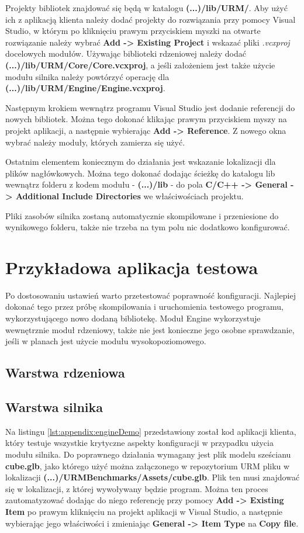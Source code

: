 Projekty bibliotek znajdować się będą w katalogu \textbf{(...)/lib/URM/}. Aby użyć ich z aplikacją klienta należy dodać projekty do rozwiązania przy pomocy Visual Studio, w którym po kliknięciu prawym przyciskiem myszki na otwarte rozwiązanie należy wybrać \textbf{Add -> Existing Project} i wskazać pliki \textit{.vcxproj} docelowych modułów. Używając biblioteki rdzeniowej należy dodać \textbf{(...)/lib/URM/Core/Core.vcxproj}, a jeśli założeniem jest także użycie modułu silnika należy powtórzyć operację dla \textbf{(...)/lib/URM/Engine/Engine.vcxproj}.

Następnym krokiem wewnątrz programu Visual Studio jest dodanie referencji do nowych bibliotek. Można tego dokonać klikając prawym przyciskiem myszy na projekt aplikacji, a następnie wybierając \textbf{Add -> Reference}. Z nowego okna wybrać należy moduły, których zamierza się użyć.

Ostatnim elementem koniecznym do działania jest wskazanie lokalizacji dla plików nagłówkowych. Można tego dokonać dodając ścieżkę do katalogu lib wewnątrz folderu z kodem modułu - \textbf{(...)/lib} - do pola \textbf{C/C++ -> General -> Additional Include Directories} we właściwościach projektu.

Pliki zasobów silnika zostaną automatycznie skompilowane i przeniesione do wynikowego folderu, także nie trzeba na tym polu nic dodatkowo konfigurować. 

\section*{Przykładowa aplikacja testowa}
Po dostosowaniu ustawień warto przetestować poprawność konfiguracji. Najlepiej dokonać tego przez próbę skompilowania i uruchomienia testowego programu, wykorzystującego nowo dodaną bibliotekę. Moduł Engine wykorzystuje wewnętrznie moduł rdzeniowy, także nie jest konieczne jego osobne sprawdzanie, jeśli w planach jest użycie modułu wysokopoziomowego. 

\subsection*{Warstwa rdzeniowa}

\subsection*{Warstwa silnika}
Na listingu \ref{lst:appendix:engineDemo} przedstawiony został kod aplikacji klienta, który testuje wszystkie krytyczne aspekty konfiguracji w przypadku użycia modułu silnika. Do poprawnego działania wymagany jest plik modelu sześcianu \textbf{cube.glb}, jako którego użyć można załączonego w repozytorium URM \cite{GitHub:Minik:MasterThesisUniversalRenderingModuleD3D11} pliku w lokalizacji \textbf{(...)/URMBenchmarks/Assets/cube.glb}. Plik ten musi znajdować się w lokalizacji, z której wywoływany będzie program. Można ten proces zautomatyzować dodając do niego referencję przy pomocy \textbf{Add -> Existing Item} po prawym kliknięciu na projekt aplikacji w Visual Studio, a następnie wybierając jego właściwości i zmieniając \textbf{General -> Item Type} na \textbf{Copy file}.

